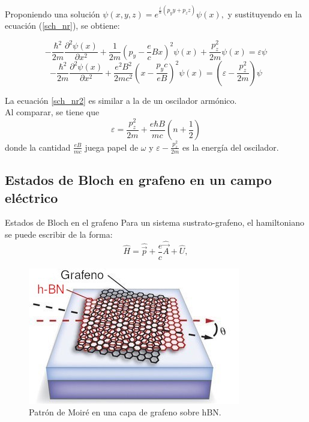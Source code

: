 \begin{frame}
	Proponiendo una solución $\psi(x,y,z) = e^{\frac{i}{\hbar}(p_yy+p_zz)}\psi(x),$
	y sustituyendo en la ecuación (\ref{sch_nr}), se obtiene:

	\begin{equation}
    -\frac{\hbar^2}{2m}\frac{\partial^2\psi(x)}{\partial x^2} + \frac{1}{2m} \left( p_y-\frac{e}{c}Bx \right)^2 \psi(x) + \frac{p_z^2}{2m} \psi(x) = \varepsilon \psi
	\end{equation}
	\begin{equation}
    -\frac{\hbar^2}{2m}\frac{\partial^2\psi(x)}{\partial x^2} + \frac{e^2B^2}{2mc^2} \left( x-\frac{p_yc}{eB} \right)^2 \psi(x)  = \left(\varepsilon -\frac{p_z^2}{2m}\right) \psi
    \label{sch_nr2}
	\end{equation}
\end{frame}

\begin{frame}
	La ecuación \ref{sch_nr2} es similar a la de un oscilador armónico.\\
	Al comparar, se tiene que
	\begin{equation}
    \varepsilon = \frac{p_z^2}{2m} + \frac{e\hbar B}{mc}\left(n+\frac{1}{2}\right)
	\end{equation}
	donde la cantidad $\frac{eB}{mc}$ juega papel de $\omega$  y $\varepsilon -\frac{p_z^2}{2m}$ es la energía del oscilador.
\end{frame}

\subsection{Estados de Bloch en grafeno en un campo eléctrico}

\begin{frame}{Estados de Bloch en el grafeno}
	Para un sistema sustrato-grafeno, el hamiltoniano se puede escribir de la forma:
	\begin{equation}
			\hat{H} = \hat{\vec{p}}+\frac{e}{c}\hat{\vec{A}} + \hat{U},
	\end{equation}

	\begin{figure}[t]
		\centering
		\includegraphics[scale=0.4]{graficas/Moire.jpg}
		\caption{Patrón de Moiré en una capa de grafeno sobre hBN.}
		\label{moire}
	\end{figure}
\end{frame}

